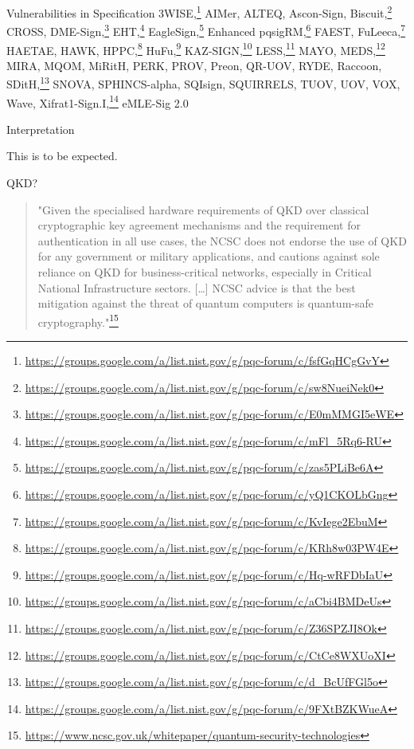 \documentclass[xcolor=table,10pt,aspectratio=169]{beamer}
\begin{document}
\begin{frame}[label={sec:orgd52e26d}]{Vulnerabilities in Specification}
\alert{3WISE},\footnote{\url{https://groups.google.com/a/list.nist.gov/g/pqc-forum/c/fsfGqHCgGvY}}
AIMer,
ALTEQ,
Ascon-Sign,
\alert{Biscuit},\footnote{\url{https://groups.google.com/a/list.nist.gov/g/pqc-forum/c/sw8NueiNek0}}
CROSS,
\alert{DME-Sign},\footnote{\url{https://groups.google.com/a/list.nist.gov/g/pqc-forum/c/E0mMMGI5eWE}}
\alert{EHT},\footnote{\url{https://groups.google.com/a/list.nist.gov/g/pqc-forum/c/mFl\_5Rq6-RU}}
\alert{EagleSign},\footnote{\url{https://groups.google.com/a/list.nist.gov/g/pqc-forum/c/zas5PLiBe6A}}
\alert{Enhanced pqsigRM},\footnote{\url{https://groups.google.com/a/list.nist.gov/g/pqc-forum/c/yQ1CKOLbGng}}
FAEST,
\alert{FuLeeca},\footnote{\url{https://groups.google.com/a/list.nist.gov/g/pqc-forum/c/KvIege2EbuM}}
HAETAE,
HAWK,
\alert{HPPC},\footnote{\url{https://groups.google.com/a/list.nist.gov/g/pqc-forum/c/KRh8w03PW4E}}
\alert{HuFu},\footnote{\url{https://groups.google.com/a/list.nist.gov/g/pqc-forum/c/Hq-wRFDbIaU}}
\alert{KAZ-SIGN},\footnote{\url{https://groups.google.com/a/list.nist.gov/g/pqc-forum/c/aCbi4BMDeUs}}
\alert{LESS},\footnote{\url{https://groups.google.com/a/list.nist.gov/g/pqc-forum/c/Z36SPZJI8Ok}}
MAYO,
\alert{MEDS},\footnote{\url{https://groups.google.com/a/list.nist.gov/g/pqc-forum/c/CtCe8WXUoXI}}
MIRA,
MQOM,
MiRitH,
PERK,
PROV,
Preon,
QR-UOV,
RYDE,
Raccoon,
\alert{SDitH},\footnote{\url{https://groups.google.com/a/list.nist.gov/g/pqc-forum/c/d\_BcUfFGl5o}}
SNOVA,
SPHINCS-alpha,
SQIsign,
SQUIRRELS,
TUOV,
UOV,
VOX,
Wave,
\alert{Xifrat1-Sign.I},\footnote{\url{https://groups.google.com/a/list.nist.gov/g/pqc-forum/c/9FXtBZKWueA}}
eMLE-Sig 2.0
\end{frame}

\begin{frame}[label={sec:org113536e}]{Interpretation}
\begin{center}
This is to be expected.
\end{center}
\end{frame}

\begin{frame}[label={sec:orga7e9159}]{QKD?}
\begin{quote}
"Given the specialised hardware requirements of QKD over classical cryptographic key agreement mechanisms and the requirement for authentication in all use cases, the NCSC does not endorse the use of QKD for any government or military applications, and cautions against sole reliance on QKD for business-critical networks, especially in Critical National Infrastructure sectors. […] NCSC advice is that the best mitigation against the threat of quantum computers is quantum-safe cryptography."\footnote{\url{https://www.ncsc.gov.uk/whitepaper/quantum-security-technologies}}
\end{quote}
\end{frame}
\end{document}
